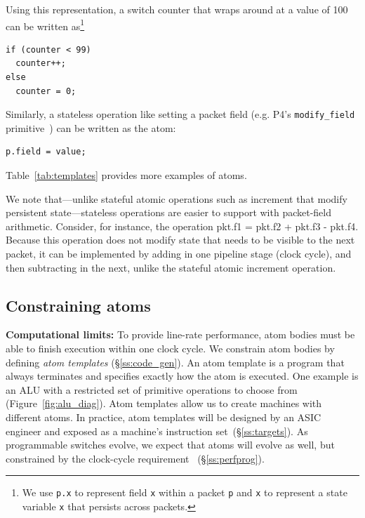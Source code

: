 Using this representation, a switch counter that wraps around at a
value of 100 can be written as\footnote{We use {\tt p.x} to
  represent field {\tt x} within a packet {\tt p} and {\tt x} to
  represent a state variable {\tt x} that persists across packets.}
\begin{lstlisting}[style=customc, numbers=none, frame=none]
if (counter < 99)
  counter++;
else
  counter = 0;
\end{lstlisting}
Similarly, a stateless operation like setting a packet field
(e.g. P4's {\tt modify\_field} primitive~\cite{p4spec}) can be written
as the atom:
\begin{lstlisting}[style=customc, numbers=none, frame=none]
  p.field = value;
\end{lstlisting}
Table~\ref{tab:templates} provides more examples of atoms.

We note that---unlike stateful atomic operations such as increment
that modify persistent state---stateless operations are easier to
support with packet-field arithmetic. Consider, for instance, the
operation pkt.f1 = pkt.f2 + pkt.f3 - pkt.f4. Because this operation
does not modify state that needs to be visible to the next packet, it
can be implemented by adding in one pipeline stage (clock cycle), and
then subtracting in the next, unlike the stateful atomic increment
operation.
\subsection{Constraining atoms}
\label{s:atomConstraints}

\textbf{Computational limits:} To provide line-rate performance, atom
bodies must be able to finish execution within one clock cycle. We
constrain atom bodies by defining {\it atom templates}
(\S\ref{ss:code_gen}).  An atom template is a program that always
terminates and specifies exactly how the atom is executed. One example
is an ALU with a restricted set of primitive operations to choose from
(Figure~\ref{fig:alu_diag}). Atom templates allow us to create
\absmachine machines with different atoms.  In practice, atom
templates will be designed by an ASIC engineer and exposed as a
machine's instruction set~(\S\ref{ss:targets}).  As programmable
switches evolve, we expect that atoms will evolve as well, but
constrained by the clock-cycle requirement ~(\S\ref{ss:perfprog}).

